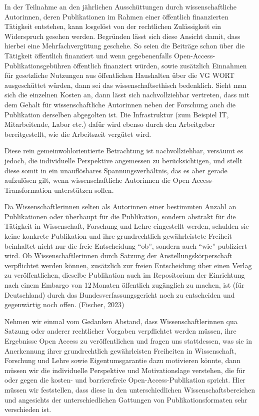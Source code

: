 \documentclass[a4paper,
fontsize=11pt,
oneside,
numbers=noperiodatend,
parskip=half-,
bibliography=totoc,
final
]{scrartcl}
\begin{document}
In der Teilnahme an den jährlichen Ausschüttungen durch
wissenschaftliche Autorinnen, deren Publikationen im Rahmen einer
öffentlich finanzierten Tätigkeit entstehen, kann losgelöst von der
rechtlichen Zulässigkeit ein Widerspruch gesehen werden. Begründen lässt
sich diese Ansicht damit, dass hierbei eine Mehrfachvergütung geschehe.
So seien die Beiträge schon über die Tätigkeit öffentlich finanziert und
wenn gegebenenfalls Open-Access-Publikationsgebühren öffentlich
finanziert würden, sowie zusätzlich Einnahmen für gesetzliche Nutzungen
aus öffentlichen Haushalten über die VG WORT ausgeschüttet würden, dann
sei das wissenschaftsethisch bedenklich. Sieht man sich die einzelnen
Kosten an, dann lässt sich nachvollziehbar vertreten, dass mit dem
Gehalt für wissenschaftliche Autorinnen neben der Forschung auch die
Publikation derselben abgegolten ist. Die Infrastruktur (zum Beispiel
IT, Mitarbeitende, Labor etc.) dafür wird ebenso durch den Arbeitgeber
bereitgestellt, wie die Arbeitszeit vergütet wird.

Diese rein gemeinwohlorientierte Betrachtung ist nachvollziehbar,
versäumt es jedoch, die individuelle Perspektive angemessen zu
berücksichtigen, und stellt diese somit in ein unauflösbares
Spannungsverhältnis, das es aber gerade aufzulösen gilt, wenn
wissenschaftliche Autorinnen die Open-Access-Transformation unterstützen
sollen.

Da Wissenschaftlerinnen selten als Autorinnen einer bestimmten Anzahl an
Publikationen oder überhaupt für die Publikation, sondern abstrakt für
die Tätigkeit in Wissenschaft, Forschung und Lehre eingestellt werden,
schulden sie keine konkrete Publikation und ihre grundrechtlich
gewährleistete Freiheit beinhaltet nicht nur die freie Entscheidung
\enquote{ob}, sondern auch \enquote{wie} publiziert wird. Ob
Wissenschaftlerinnen durch Satzung der Anstellungskörperschaft
verpflichtet werden können, zusätzlich zur freien Entscheidung über
einen Verlag zu veröffentlichen, dieselbe Publikation auch im
Repositorium der Einrichtung nach einem Embargo von 12\,Monaten
öffentlich zugänglich zu machen, ist (für Deutschland) durch das
Bundesverfassungsgericht noch zu entscheiden und gegenwärtig noch offen.
(Fischer, 2023)

Nehmen wir einmal vom Gedanken Abstand, dass Wissenschaftlerinnen qua
Satzung oder anderer rechtlicher Vorgaben verpflichtet werden müssen,
ihre Ergebnisse Open Access zu veröffentlichen und fragen uns
stattdessen, was sie in Anerkennung ihrer grundrechtlich gewährleisten
Freiheiten in Wissenschaft, Forschung und Lehre sowie Eigentumsgarantie
dazu motivieren könnte, dann müssen wir die individuelle Perspektive und
Motivationslage verstehen, die für oder gegen die kosten- und
barrierefreie Open-Access-Publikation spricht. Hier müssen wir
feststellen, dass diese in den unterschiedlichen Wissenschaftsbereichen
und angesichts der unterschiedlichen Gattungen von Publikationsformaten
sehr verschieden ist.
\end{document}
